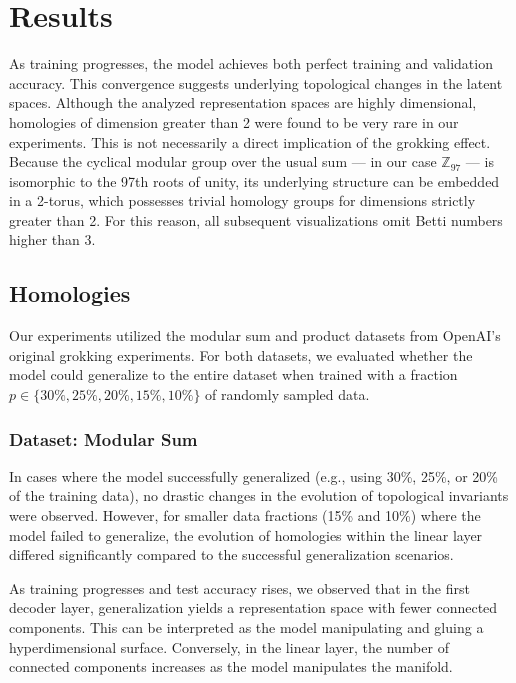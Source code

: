 \section{Results}

As training progresses, the model achieves both perfect training and validation accuracy. This convergence suggests underlying topological changes in the latent spaces. Although the analyzed representation spaces are highly dimensional, homologies of dimension greater than 2 were found to be very rare in our experiments. This is not necessarily a direct implication of the grokking effect. Because the cyclical modular group over the usual sum --- in our case $\mathbb{Z}_{97}$ --- is isomorphic to the 97th roots of unity, its underlying structure can be embedded in a 2-torus, which possesses trivial homology groups for dimensions strictly greater than 2. For this reason, all subsequent visualizations omit Betti numbers higher than 3.

\subsection{Homologies}

Our experiments utilized the modular sum and product datasets from OpenAI's original grokking experiments. For both datasets, we evaluated whether the model could generalize to the entire dataset when trained with a fraction $p \in \{30\%, 25\%, 20\%, 15\%, 10\%\}$ of randomly sampled data. 

\subsubsection{Dataset: Modular Sum}

In cases where the model successfully generalized (e.g., using 30\%, 25\%, or 20\% of the training data), no drastic changes in the evolution of topological invariants were observed. However, for smaller data fractions (15\% and 10\%) where the model failed to generalize, the evolution of homologies within the linear layer differed significantly compared to the successful generalization scenarios. 

As training progresses and test accuracy rises, we observed that in the first decoder layer, generalization yields a representation space with fewer connected components. This can be interpreted as the model manipulating and gluing a hyperdimensional surface. Conversely, in the linear layer, the number of connected components increases as the model manipulates the manifold.

